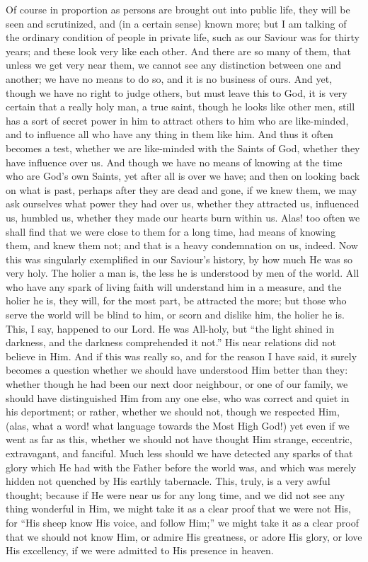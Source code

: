 Of course in proportion as persons are brought out into public
life, they will be seen and scrutinized, and (in a certain sense)
known more; but I am talking of the ordinary condition of people in
private life, such as our Saviour was for thirty years; and these look
very like each other. And there are so many of them, that unless we
get very near them, we cannot see any distinction between one and
another; we have no means to do so, and it is no business of ours. And
yet, though we have no right to judge others, but must leave this to
God, it is very certain that a really holy man, a true saint, though
he looks like other men, still has a sort of secret power in him to
attract others to him who are like-minded, and to influence all who
have any thing in them like him. And thus it often becomes a test,
whether we are like-minded with the Saints of God, whether they have
influence over us. And though we have no means of knowing at the time
who are God's own Saints, yet after all is over we have; and then on
looking back on what is past, perhaps after they are dead and gone, if
we knew them, we may ask ourselves what power they had over us,
whether they attracted us, influenced us, humbled us, whether they
made our hearts burn within us. Alas! too often we shall find that we
were close to them for a long time, had means of knowing them, and
knew them not; and that is a heavy condemnation on us, indeed. Now
this was singularly exemplified in our Saviour's history, by how
much He was so very holy. The holier a man is, the less he is
understood by men of the world. All who have any spark of living faith
will understand him in a measure, and the holier he is, they will, for
the most part, be attracted the more; but those who serve the world
will be blind to him, or scorn and dislike him, the holier he is.
This, I say, happened to our Lord. He was All-holy, but ``the
light shined in darkness, and the darkness comprehended it not.''
His near relations did not believe in Him. And if this was really so,
and for the reason I have said, it surely becomes a question whether
we should have understood Him better than they: whether though he had
been our next door neighbour, or one of our family, we should have
distinguished Him from any one else, who was correct and quiet in his
deportment; or rather, whether we should not, though we respected Him,
(alas, what a word! what language towards the Most High God!) yet even
if we went as far as this, whether we should not have thought Him
strange, eccentric, extravagant, and fanciful. Much less should we
have detected any sparks of that glory which He had with the Father
before the world was, and which was merely hidden not quenched by His
earthly tabernacle. This, truly, is a very awful thought; because if
He were near us for any long time, and we did not see any thing
wonderful in Him, we might take it as a clear proof that we were not
His, for ``His sheep know His voice, and follow Him;'' we
might take it as a clear proof that we should not know Him, or admire
His greatness, or adore His glory, or love His excellency, if we were
admitted to His presence in heaven.

